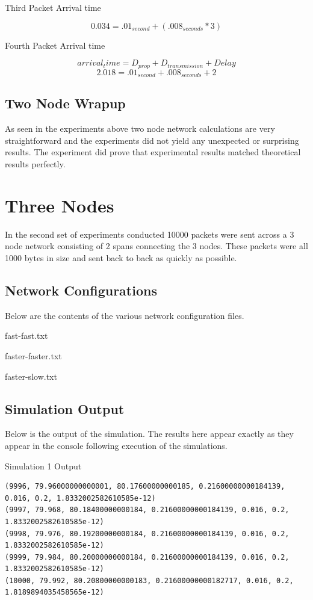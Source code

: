 \documentclass[12pt]{article}
\begin{document}
\centerline{Third Packet Arrival time}
\begin{equation}
  0.034 = .01_{second} + (.008_{seconds} * 3)
\end{equation}

\centerline{Fourth Packet Arrival time}
\begin{equation}
arrival_time = D_{prop} + D_{transmission} + Delay
\end{equation}
\begin{equation}
  2.018 = .01_{second} + .008_{seconds} + 2
\end{equation}

\subsection{Two Node Wrapup}
As seen in the experiments above two node network calculations are very straightforward and the experiments did not yield any unexpected or surprising results. The experiment did prove that experimental results matched theoretical results perfectly.



\section{Three Nodes}
In the second set of experiments conducted 10000 packets were sent across a 3 node network consisting of 2 spans connecting the 3 nodes. These packets were all 1000 bytes in size and sent back to back as quickly as possible. 

\subsection{Network Configurations}
Below are the contents of the various network configuration files.\\

\centerline{fast-fast.txt}


\centerline{faster-faster.txt}


\centerline{faster-slow.txt}


\subsection{Simulation Output}
Below is the output of the simulation. The results here appear exactly as they appear in the console following execution of the simulations.\\
\centerline{Simulation 1 Output}
\begin{verbatim}
(9996, 79.96000000000001, 80.17600000000185, 0.21600000000184139, 0.016, 0.2, 1.8332002582610585e-12)
(9997, 79.968, 80.18400000000184, 0.21600000000184139, 0.016, 0.2, 1.8332002582610585e-12)
(9998, 79.976, 80.19200000000184, 0.21600000000184139, 0.016, 0.2, 1.8332002582610585e-12)
(9999, 79.984, 80.20000000000184, 0.21600000000184139, 0.016, 0.2, 1.8332002582610585e-12)
(10000, 79.992, 80.20800000000183, 0.21600000000182717, 0.016, 0.2, 1.8189894035458565e-12)
\end{verbatim}
\end{document}
